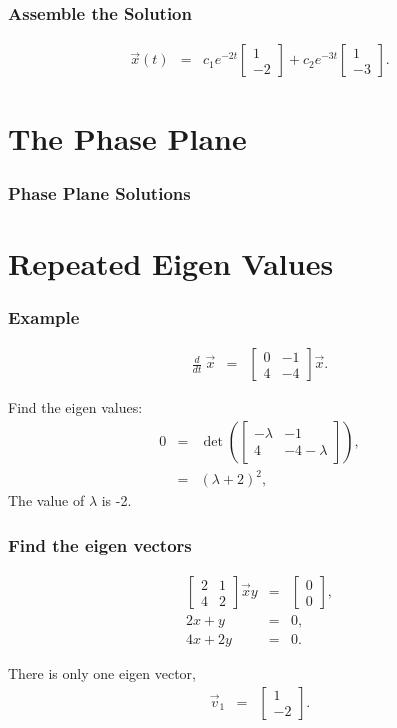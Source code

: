 \documentclass{beamer}
\newcommand{\deriv}[2]{\frac{d}{d#2}#1}
\newcommand{\lp}{\left(}
\newcommand{\rp}{\right)}
\newcommand{\arrayTwo}[4]{
  \left[
  \begin{array}{rr}
    #1 & #2 \\
    #3 & #4
  \end{array}
  \right]
}
\newcommand{\vecTwo}[2]{
  \left[
  \begin{array}{r}
    #1 \\  #2
  \end{array}
  \right]
}
\begin{document}
\begin{frame}
  \frametitle{Assemble the Solution}

  \begin{eqnarray*}
    \vec{x}(t) & = & c_1 e^{-2t} \vecTwo{1}{-2} + c_2 e^{-3t} \vecTwo{1}{-3}.
  \end{eqnarray*}

\end{frame}


\section{The Phase Plane}

\begin{frame}
  \frametitle{Phase Plane Solutions}


\end{frame}

\section{Repeated Eigen Values}

\begin{frame}
  \frametitle{Example}

  \begin{eqnarray*}
    \deriv{~}{t} \vec{x} & = & \arrayTwo{0}{-1}{4}{-4} \vec{x}.
  \end{eqnarray*}

  {
    Find the eigen values:
    \begin{eqnarray*}
      0 & = & \det\lp\arrayTwo{-\lambda}{-1}{4}{-4-\lambda}\rp, \\
      & = & \lp \lambda + 2 \rp^2,
    \end{eqnarray*}
    The value of $\lambda$ is -2.
  }

\end{frame}


\begin{frame}
  \frametitle{Find the eigen vectors}

  \begin{eqnarray*}
    \arrayTwo{2}{1}{4}{2} \vec{x}{y} & = & \vecTwo{0}{0}, \\
    2x + y & = & 0, \\
    4x + 2y & = & 0.
  \end{eqnarray*}

  There is only one eigen vector,
  \begin{eqnarray*}
    \vec{v}_1 & = & \vecTwo{1}{-2}.
  \end{eqnarray*}

\end{frame}
\end{document}
